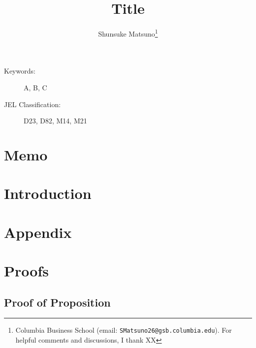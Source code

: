 \documentclass[12pt,letterpaper]{article}
\title{Title}
\author{Shunsuke Matsuno\thanks{Columbia Business School (email: {\tt{SMatsuno26@gsb.columbia.edu}}).
For helpful comments and discussions, I thank XX }}
\begin{document}
\maketitle

\begin{abstract}
    \lipsum[1]
\end{abstract}


\begin{description}
    \item[Keywords:] A, B, C
    \item[JEL Classification:] D23, D82, M14, M21
\end{description}


\section*{Memo}

\clearpage
\section{Introduction}


\clearpage
%     
%     
\newpage
\appendix
\section*{\Large {Appendix}}
\section{Proofs} %
\subsection*{Proof of Proposition}
\end{document}
